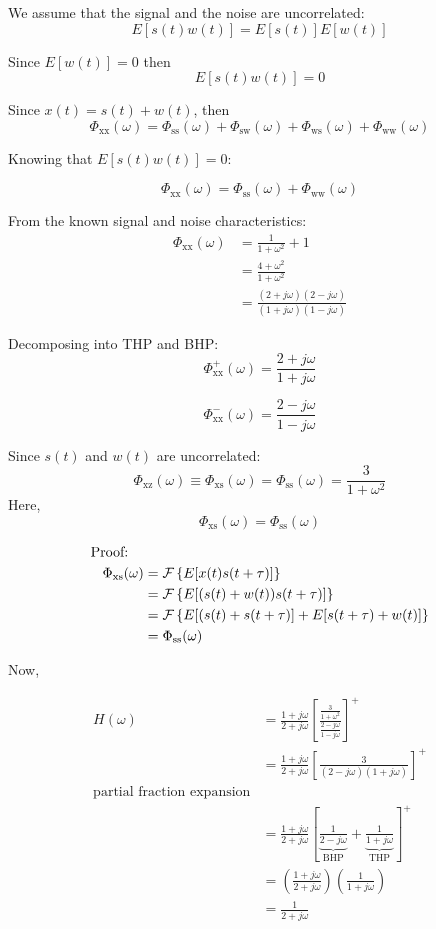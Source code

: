 \documentclass[12pt]{book}
\theoremstyle{definition}
\begin{document}
\bigskip
We assume that the signal and the noise are uncorrelated:
\[
E[s(t)w(t)] = E[s(t)]E[w(t)]
\]

Since $E[w(t)] = 0$ then 
\[
E[s(t)w(t)] = 0
\]

Since \(x(t) = s(t) + w(t)\), then 
\[
\Phi_\mathrm{xx}(\omega) = \Phi_\mathrm{ss}(\omega) + \Phi_\mathrm{sw}(\omega) + \Phi_\mathrm{ws}(\omega) + \Phi_\mathrm{ww}(\omega)
\]

Knowing that $E[s(t)w(t)] = 0$:

\[
\Phi_\mathrm{xx}(\omega) = \Phi_\mathrm{ss}(\omega) + \Phi_\mathrm{ww}(\omega)
\]

From the known signal and noise characteristics:
\[
\begin{aligned}
   \Phi_\mathrm{xx}(\omega) & = \frac{1}{1+\omega^2}+ 1\\
                        & = \frac{4+\omega^2}{1+\omega^2}\\
                        & = \frac{(2+j\omega)(2-j\omega)}{(1+j\omega)(1-j\omega)}
\end{aligned}
\]

Decomposing into THP and BHP:
\[
\Phi_\mathrm{xx}^+(\omega) = \frac{2+j\omega}{1+j\omega}
\]

\[
\Phi_\mathrm{xx}^-(\omega) = \frac{2-j\omega}{1-j\omega}
\]

Since $s(t)$ and $w(t)$ are uncorrelated:
\[
\Phi_\mathrm{xz}(\omega) \equiv \Phi_\mathrm{xs}(\omega) = \Phi_\mathrm{ss}(\omega) = \frac{3}{1+\omega^2}
\]
Here, \[
\Phi_\mathrm{xs}(\omega) = \Phi_\mathrm{ss}(\omega)
\]




\[
\begin{aligned}
   \text{Proof: \,\,\,\,} & \\
   \Phi_\mathrm{xs}(\omega) & = \mathcal{F} \left \{ E[x(t)s(t+\tau)] \right \} \\
   & = \mathcal{F} \left \{ E[(s(t) + w(t))s(t+\tau)] \right \}\\
   & = \mathcal{F} \left \{ E[(s(t) + s(t+ \tau)] + E[s(t+\tau) + w(t)] \right \}\\
   & = \Phi_\mathrm{ss}(\omega)
\end{aligned}
\]


\bigskip
Now,

\[
\begin{aligned}
    H(\omega)   & = \frac{1+j\omega}{2+j \omega} \left [ \frac {\frac{3}{1+ \omega^2}}{\frac{2-j \omega}{1-j \omega}} \right ]^+\\
            & = \frac{1+j\omega}{2+j \omega} \left [ \frac{3}{(2-j \omega)(1 + j \omega)} \right ]^+\\
            \text{partial fraction expansion} & \\
            & = \frac{1+j\omega}{2+j \omega} \left [ \underbrace{\frac{1}{2 - j \omega}}_{\text{BHP}} + \underbrace{\frac{1}{1 + j \omega}}_{\text{THP}} \right ] ^+\\
            & = \left (\frac{1+j\omega}{2+j \omega} \right ) \left (\frac{1}{1+j\omega} \right ) \\
            & = \frac{1}{2+j \omega}
\end{aligned}
\]
\end{document}
